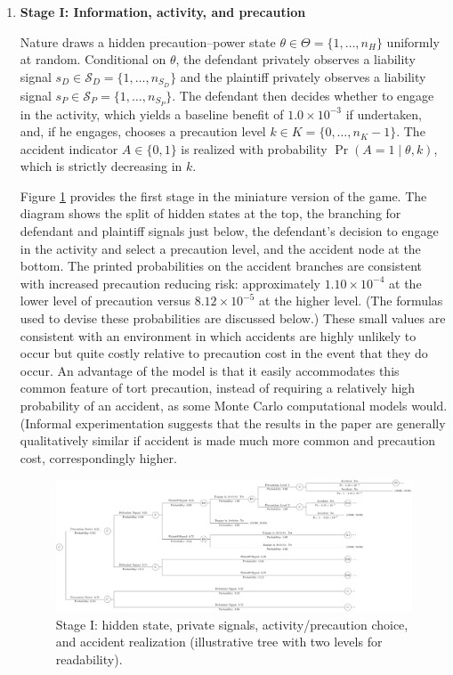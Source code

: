 \documentclass{article}
\begin{document}
\begin{enumerate}
  \item \textbf{Stage I: Information, activity, and precaution}

Nature draws a hidden precaution--power state $\theta \in \Theta = \{1,\dots,n_H\}$ uniformly at random. Conditional on $\theta$, the defendant privately observes a liability signal $s_D \in \mathcal{S}_D = \{1,\dots,n_{S_D}\}$ and the plaintiff privately observes a liability signal $s_P \in \mathcal{S}_P = \{1,\dots,n_{S_P}\}$. The defendant then decides whether to engage in the activity, which yields a baseline benefit of $1.0 \times 10^{-3}$ if undertaken, and, if he engages, chooses a precaution level $k \in K = \{0,\dots,n_K-1\}$. The accident indicator $A \in \{0,1\}$ is realized with probability $\Pr(A=1 \mid \theta,k)$, which is strictly decreasing in $k$. 

Figure \ref{fig:smalltree_beginning.pdf} provides the first stage in the miniature version of the game. The diagram shows the split of hidden states at the top, the branching for defendant and plaintiff signals just below, the defendant’s decision to engage in the activity and select a precaution level, and the accident node at the bottom. The printed probabilities on the accident branches are consistent with increased precaution reducing risk: approximately $1.10 \times 10^{-4}$ at the lower level of precaution versus $8.12 \times 10^{-5}$ at the higher level. (The formulas used to devise these probabilities are discussed below.) These small values are consistent with an environment in which accidents are highly unlikely to occur but quite costly relative to precaution cost in the event that they do occur. An advantage of the model is that it easily accommodates this common feature of tort precaution, instead of requiring a relatively high probability of an accident, as some Monte Carlo computational models would. (Informal experimentation suggests that the results in the paper are generally qualitatively similar if accident is made much more common and precaution cost, correspondingly higher.

  \begin{figure}[t]
    \centering
    \includegraphics[width=\textwidth]{../Figures/smalltree_beginning.pdf}
    \caption{Stage I: hidden state, private signals, activity/precaution choice, and accident realization (illustrative tree with two levels for readability).}
    \label{fig:smalltree_beginning.pdf}
  \end{figure}


\end{enumerate}
\end{document}
